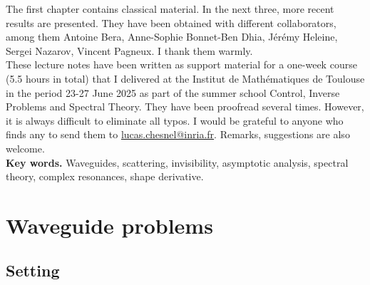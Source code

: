 \documentclass[11pt,a4paper]{report}
\begin{document}
The first chapter contains classical material. In the next three,  more recent results are presented. They have been obtained with different collaborators, among them Antoine Bera, Anne-Sophie Bonnet-Ben Dhia, J\'er\'emy Heleine, Sergei Nazarov, Vincent Pagneux. I thank them warmly.\\
\newline
These lecture notes have been written as support material for a one-week course (5.5 hours in total) that I delivered at the Institut de Math\'ematiques de Toulouse in the period 23-27 June 2025 as part of the summer school Control, Inverse Problems and Spectral Theory. They have been proofread several times. However, it is always difficult to eliminate all typos. I would be grateful to anyone who finds any to send them to \url{lucas.chesnel@inria.fr}. Remarks, suggestions are also welcome. \\
\newline
\noindent\textbf{Key words.} Waveguides, scattering, invisibility, asymptotic analysis, spectral theory, complex resonances, shape derivative. 


\newpage
\tableofcontents

\chapter{Waveguide problems}\label{ChapWaveguides}


\section{Setting}
\end{document}
